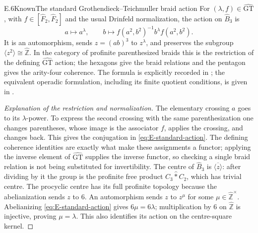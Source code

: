 \begin{statement}{E.6}{Known}{The standard Grothendieck--Teichmuller braid action}
For $(\lambda,f)\in\widehat{\mathrm{GT}}$, with
$f\in[\widehat F_2,\widehat F_2]$ and the usual Drinfeld
normalization, the action on $\widehat B_3$ is
\begin{equation}\label{eq:E-standard-action}
 a\longmapsto a^\lambda,\qquad
 b\longmapsto f(a^2,b^2)^{-1}b^\lambda f(a^2,b^2).
\end{equation}
It is an automorphism, sends $z=(ab)^3$ to $z^\lambda$, and
preserves the subgroup $\langle z^2\rangle\cong\widehat{\mathbb Z}$.
In the category of profinite parenthesized braids this is the
restriction of the defining $\widehat{\mathrm{GT}}$ action;
the hexagons give the braid relations and the pentagon gives the
arity-four coherence.  The formula is explicitly recorded in
\citet[(5.4.2)]{Nakamura2013Eisenstein}; the equivalent operadic
formulation, including its finite quotient conditions, is given in
\citet[\S2 and Appendix A]{DolgushevLeLorenz2024}.
\end{statement}
\begin{proof}[Explanation of the restriction and normalization]
The elementary crossing $a$ goes to its $\lambda$-power.  To express
the second crossing with the same parenthesization one changes
parentheses, whose image is the associator $f$, applies the crossing,
and changes back.  This gives the conjugation in
\eqref{eq:E-standard-action}.  The defining coherence identities
are exactly what make these assignments a functor; applying the
inverse element of $\widehat{\mathrm{GT}}$ supplies the inverse
functor, so checking a single braid relation is not being substituted
for invertibility.  The centre of $\widehat B_3$ is
$\overline{\langle z\rangle}$: after dividing by it the group is the
profinite free product $C_3\mathbin{\widehat *}C_2$, which has trivial
centre.  The procyclic centre has its full profinite topology because
the abelianization sends $z$ to $6$.  An automorphism sends $z$ to
$z^\mu$ for some $\mu\in\widehat{\mathbb Z}^{\times}$.  Abelianizing
\eqref{eq:E-standard-action} gives $6\mu=6\lambda$; multiplication
by $6$ on $\widehat{\mathbb Z}$ is injective, proving $\mu=\lambda$.
This also identifies its action on the centre-square kernel.
\end{proof}

